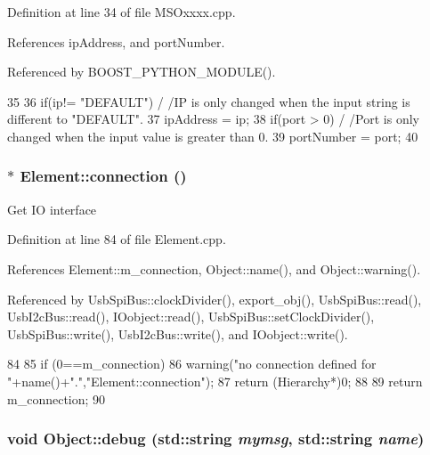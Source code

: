 Definition at line 34 of file MSOxxxx.cpp.

References ipAddress, and portNumber.

Referenced by BOOST\_\-PYTHON\_\-MODULE().


\begin{DoxyCode}
35 {
36     if(ip!= "DEFAULT")                                                              /
      /IP is only changed when the input string is different to "DEFAULT".
37         ipAddress = ip;  
38     if(port > 0)                                                                            /
      /Port is only changed when the input value is greater than 0.
39         portNumber = port;
40 }
\end{DoxyCode}
\hypertarget{classElement_af57444353c1ddf9fa0109801e97debf7}{
\subsubsection[{connection}]{ $\ast$ Element::connection ()}}
\label{classElement_af57444353c1ddf9fa0109801e97debf7}
Get IO interface 

Definition at line 84 of file Element.cpp.

References Element::m\_\-connection, Object::name(), and Object::warning().

Referenced by UsbSpiBus::clockDivider(), export\_\-obj(), UsbSpiBus::read(), UsbI2cBus::read(), IOobject::read(), UsbSpiBus::setClockDivider(), UsbSpiBus::write(), UsbI2cBus::write(), and IOobject::write().


\begin{DoxyCode}
84                               {
85   if (0==m_connection){
86     warning("no connection defined for "+name()+".","Element::connection");
87     return (Hierarchy*)0;
88   }
89   return m_connection;
90 }
\end{DoxyCode}
\hypertarget{classObject_a6c9a0397ca804e04d675ed05683f5420}{
\subsubsection[{debug}]{\setlength{\rightskip}{0pt plus 5cm}void Object::debug (std::string {\em mymsg}, \/  std::string {\em name})}}
\label{classObject_a6c9a0397ca804e04d675ed05683f5420}


